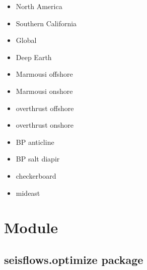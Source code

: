 \documentclass[letterpaper,10pt,english]{sphinxmanual}
\begin{document}
\begin{itemize}
\item {} 
North America

\item {} 
Southern California

\item {} 
Global

\item {} 
Deep Earth

\end{itemize}

\begin{itemize}
\item {} 
Marmousi offshore

\item {} 
Marmousi onshore

\item {} 
overthrust offshore

\item {} 
overthrust onshore

\item {} 
BP anticline

\item {} 
BP salt diapir

\end{itemize}

\begin{itemize}
\item {} 
checkerboard

\end{itemize}

\begin{itemize}
\item {} 
mideast

\end{itemize}


\chapter{Module}
\label{\detokenize{index:module}}

\section{seisflows.optimize package}
\label{\detokenize{ref/seisflows.optimize:seisflows-optimize-package}}\label{\detokenize{ref/seisflows.optimize:sfoptimize}}\label{\detokenize{ref/seisflows.optimize::doc}}\label{\detokenize{ref/seisflows.optimize::doc}}\label{\detokenize{ref/seisflows.optimize::doc}}
\end{document}
